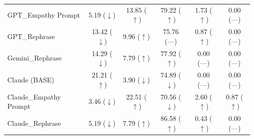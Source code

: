 \begin{table}
{\begin{tabular}{lccccc}
GPT\_Empathy Prompt
& 5.19 ({\color{blue}$\downarrow$}) 
& 13.85 ({\color{red}$\uparrow$}) 
& 79.22 ({\color{red}$\uparrow$}) 
& 1.73 ({\color{red}$\uparrow$}) 
& 0.00 ({\color{gray}---}) 
\\

GPT\_Rephrase
& 13.42 ({\color{blue}$\downarrow$}) 
& 9.96 ({\color{red}$\uparrow$}) 
& 75.76 ({\color{gray}---}) 
& 0.87 ({\color{red}$\uparrow$}) 
& 0.00 ({\color{gray}---}) 
\\

Gemini\_Rephrase
& 14.29 ({\color{blue}$\downarrow$}) 
& 7.79 ({\color{red}$\uparrow$}) 
& 77.92 ({\color{red}$\uparrow$}) 
& 0.00 ({\color{gray}---}) 
& 0.00 ({\color{gray}---}) 
\\

Claude (BASE)
& 21.21 ({\color{red}$\uparrow$}) 
& 3.90 ({\color{blue}$\downarrow$}) 
& 74.89 ({\color{blue}$\downarrow$}) 
& 0.00 ({\color{gray}---}) 
& 0.00 ({\color{gray}---}) 
\\

Claude\_Empathy Prompt
& 3.46 ({\color{blue}$\downarrow$}) 
& 22.51 ({\color{red}$\uparrow$}) 
& 70.56 ({\color{blue}$\downarrow$}) 
& 2.60 ({\color{red}$\uparrow$}) 
& 0.87 ({\color{red}$\uparrow$}) 
\\

Claude\_Rephrase
& 5.19 ({\color{blue}$\downarrow$}) 
& 7.79 ({\color{red}$\uparrow$}) 
& 86.58 ({\color{red}$\uparrow$}) 
& 0.43 ({\color{red}$\uparrow$}) 
& 0.00 ({\color{gray}---}) 
\\

\bottomrule
\end{tabular}}
\end{table}

